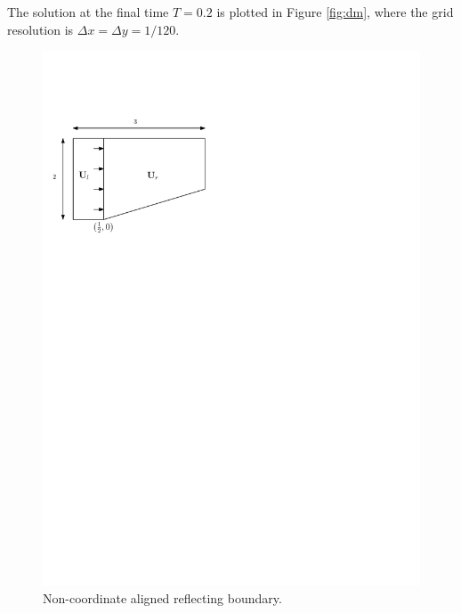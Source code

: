 The solution at the final time $T = 0.2$ is plotted in Figure \ref{fig:dm}, where the grid resolution is $\Delta x = \Delta y = 1/120$.


\begin{figure}
	\centering
	\includegraphics[width = 0.5\linewidth]{figs/dmnca}
	\caption{Non-coordinate aligned reflecting boundary.}\label{fig:dmnca}
\end{figure} 



